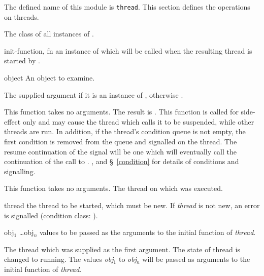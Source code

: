 \begin{optDefinition}
The defined name of this module is {\tt thread}.
This section defines the operations on threads.

%
The class of all instances of .
%
\begin{initoptions}
    \item[init-function, fn] an instance of  which will be
    called when the resulting thread is started by .
\end{initoptions}

%
\begin{arguments}
    \item[object] An object to examine.
\end{arguments}
%
\result%
The supplied argument if it is an instance of , otherwise
\nil{}.

%
This function takes no arguments.
%
\result%
The result is \nil{}.
%
\remarks%
This function is called for side-effect only and may cause the thread which
calls it to be suspended, while other threads are run.  In addition, if the
thread's condition queue is not empty, the first condition is removed from the
queue and signalled on the thread.  The resume continuation of the signal will
be one which will eventually call the continuation of the call to
.
%
\seealso%
,  and \S~\ref{condition} for
details of conditions and signalling.

%
This function takes no arguments.
%
\result%
The thread on which  was executed.

\begin{arguments}
    \item[thread] the thread to be started, which must be new.  If {\em thread}
    is not new, an error is signalled (condition class:
    ).

    \item[obj$_1$ \ldots obj$_n$] values to be passed as the arguments to the
    initial function of {\em thread}.
\end{arguments}
%
\result%
The thread which was supplied as the first argument.
%
\remarks%
The state of thread is changed to running.  The values {\em obj$_1$} to {\em
    obj$_n$} will be passed as arguments to the initial function of {\em
    thread}.


\end{optDefinition}
